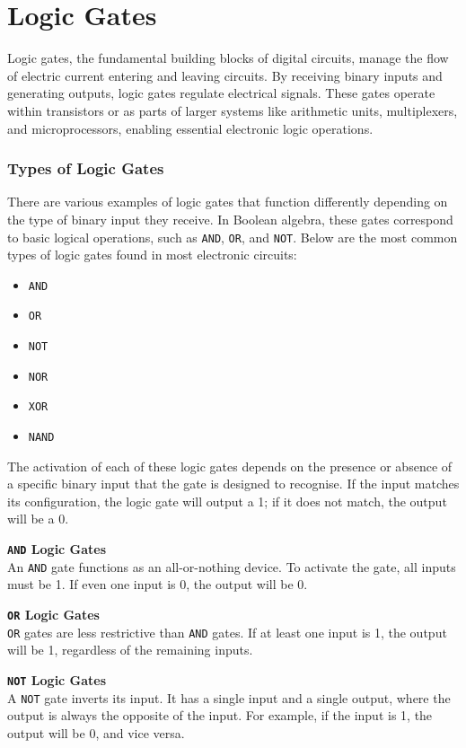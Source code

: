 \section{Logic Gates}
Logic gates, the fundamental building blocks of digital circuits, manage the flow of electric current entering and leaving circuits. By receiving binary inputs and generating outputs, logic gates regulate electrical signals. These gates operate within transistors or as parts of larger systems like arithmetic units, multiplexers, and microprocessors, enabling essential electronic logic operations.

\subsubsection*{Types of Logic Gates}
There are various examples of logic gates that function differently depending on the type of binary input they receive. In Boolean algebra, these gates correspond to basic logical operations, such as \texttt{AND}, \texttt{OR}, and \texttt{NOT}. Below are the most common types of logic gates found in most electronic circuits:

\begin{itemize}
    \item \texttt{AND}
    \item \texttt{OR}
    \item \texttt{NOT}
    \item \texttt{NOR}
    \item \texttt{XOR}
    \item \texttt{NAND}    
\end{itemize}

The activation of each of these logic gates depends on the presence or absence of a specific binary input that the gate is designed to recognise. If the input matches its configuration, the logic gate will output a 1; if it does not match, the output will be a 0.

\textbf{\texttt{AND} Logic Gates}\\
An \texttt{AND} gate functions as an all-or-nothing device. To activate the gate, all inputs must be 1. If even one input is 0, the output will be 0.

\textbf{\texttt{OR} Logic Gates}\\
\texttt{OR} gates are less restrictive than \texttt{AND} gates. If at least one input is 1, the output will be 1, regardless of the remaining inputs.

\textbf{\texttt{NOT} Logic Gates}\\
A \texttt{NOT} gate inverts its input. It has a single input and a single output, where the output is always the opposite of the input. For example, if the input is 1, the output will be 0, and vice versa.

